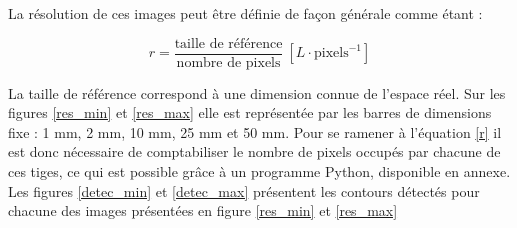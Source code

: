 \documentclass[11pt,letterpaper]{article}
\begin{document}
La résolution de ces images peut être définie de façon générale comme étant : 

\begin{equation}
  r = \frac{\text{taille de référence}}{\text{nombre de pixels}} \: [L\cdot \text{pixels} ^{-1}]
    \label{r}
\end{equation}

La taille de référence correspond à une dimension connue de l'espace réel. Sur les figures \ref{res_min} et \ref{res_max} elle est représentée par les barres de dimensions fixe : 1 mm, 2 mm, 10 mm, 25 mm et 50 mm. Pour se ramener à l'équation \ref{r} il est donc nécessaire de comptabiliser le nombre de pixels occupés par chacune de ces tiges, ce qui est possible grâce à un programme Python, disponible en annexe. Les figures \ref{detec_min} et \ref{detec_max} présentent les contours détectés pour chacune des images présentées en figure \ref{res_min} et \ref{res_max}
\end{document}
